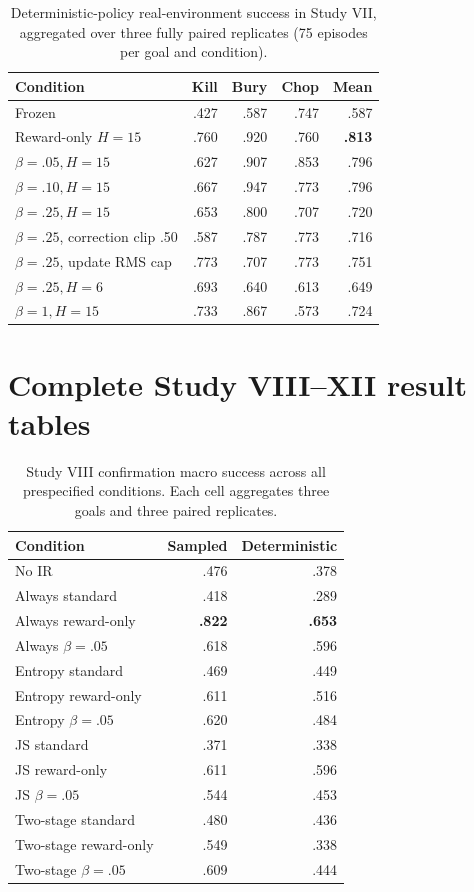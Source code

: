 \documentclass[10pt]{article}
\begin{document}
\begin{table}[H]
\centering
\small
\caption{Deterministic-policy real-environment success in Study VII, aggregated over three fully paired replicates (75 episodes per goal and condition).}
\begin{tabular}{lrrrr}
\toprule
Condition & Kill & Bury & Chop & Mean \\
\midrule
Frozen & .427 & .587 & .747 & .587 \\
Reward-only $H=15$ & .760 & .920 & .760 & \textbf{.813} \\
$\beta=.05,H=15$ & .627 & .907 & .853 & .796 \\
$\beta=.10,H=15$ & .667 & .947 & .773 & .796 \\
$\beta=.25,H=15$ & .653 & .800 & .707 & .720 \\
$\beta=.25$, correction clip .50 & .587 & .787 & .773 & .716 \\
$\beta=.25$, update RMS cap & .773 & .707 & .773 & .751 \\
$\beta=.25,H=6$ & .693 & .640 & .613 & .649 \\
$\beta=1,H=15$ & .733 & .867 & .573 & .724 \\
\bottomrule
\end{tabular}
\end{table}

\section{Complete Study VIII--XII result tables}

\begin{table}[H]
\centering
\small
\caption{Study VIII confirmation macro success across all prespecified conditions. Each cell aggregates three goals and three paired replicates.}
\begin{tabular}{lrr}
\toprule
Condition & Sampled & Deterministic \\
\midrule
No IR & .476 & .378 \\
Always standard & .418 & .289 \\
Always reward-only & \textbf{.822} & \textbf{.653} \\
Always $\beta=.05$ & .618 & .596 \\
Entropy standard & .469 & .449 \\
Entropy reward-only & .611 & .516 \\
Entropy $\beta=.05$ & .620 & .484 \\
JS standard & .371 & .338 \\
JS reward-only & .611 & .596 \\
JS $\beta=.05$ & .544 & .453 \\
Two-stage standard & .480 & .436 \\
Two-stage reward-only & .549 & .338 \\
Two-stage $\beta=.05$ & .609 & .444 \\
\bottomrule
\end{tabular}
\end{table}
\end{document}
